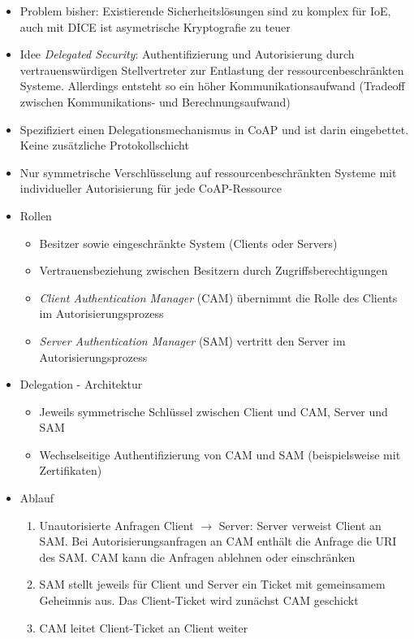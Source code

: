 \begin{itemize}
\begin{itemize}
		\item Problem bisher: Existierende Sicherheitslösungen sind zu komplex für IoE, auch mit DICE ist asymetrische Kryptografie zu teuer
		\item Idee \textit{Delegated Security}: Authentifizierung und Autorisierung durch vertrauenswürdigen Stellvertreter zur Entlastung der ressourcenbeschränkten Systeme. Allerdings entsteht so ein höher Kommunikationsaufwand (Tradeoff zwischen Kommunikations- und Berechnungsaufwand)
		\item Spezifiziert einen Delegationsmechanismus in CoAP und ist darin eingebettet. Keine zusätzliche Protokollschicht
		\item Nur symmetrische Verschlüsselung auf ressourcenbeschränkten Systeme mit individueller Autorisierung für jede CoAP-Ressource
		\item Rollen
		\begin{itemize}
			\item Besitzer sowie eingeschränkte System (Clients oder Servers)
			\item Vertrauensbeziehung zwischen Besitzern durch Zugriffsberechtigungen
			\item \textit{Client Authentication Manager} (CAM) übernimmt die Rolle des Clients im Autorisierungsprozess
			\item \textit{Server Authentication Manager} (SAM) vertritt den Server im Autorisierungsprozess
		\end{itemize}
		\item Delegation - Architektur
		\begin{itemize}
			\item Jeweils symmetrische Schlüssel zwischen Client und CAM, Server und SAM
			\item Wechselseitige Authentifizierung von CAM und SAM (beispielsweise mit Zertifikaten)
		\end{itemize}
		\item Ablauf
		\begin{enumerate}
			\item Unautorisierte Anfragen Client \(\rightarrow\) Server: Server verweist Client an SAM. Bei Autorisierungsanfragen an CAM enthält die Anfrage die URI des SAM. CAM kann die Anfragen ablehnen oder einschränken
			\item SAM stellt jeweils für Client und Server ein Ticket mit gemeinsamem Geheimnis aus. Das Client-Ticket wird zunächst CAM geschickt
			\item CAM leitet Client-Ticket an Client weiter
		\end{enumerate}
	\end{itemize}
\end{itemize}


